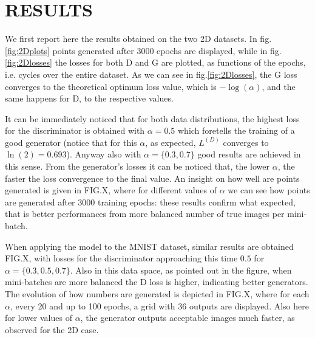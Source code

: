 \section{RESULTS} \label{results}

We first report here the results obtained on the two 2D datasets. In fig.\ref{fig:2Dplots} points generated after 3000 epochs are displayed, while in fig.\ref{fig:2Dlosses} the losses for both D and G are plotted, as functions of the epochs, i.e. cycles over the entire dataset.
As we can see in fig.\ref{fig:2Dlosses}, the G loss converges to the theoretical optimum loss value, which is $-\log(\alpha)$, and the same happens for D, to the respective values.

It can be immediately noticed that for both data distributions, the highest loss for the discriminator is obtained with $\alpha=0.5$ which foretells the training of a good generator (notice that for this $\alpha$, as expected, $L^{(D)}$ converges to $\ln(2)=0.693$). Anyway also with $\alpha=\{0.3,0.7\}$ good results are achieved in this sense. From the generator's losses it can be noticed that, the lower $\alpha$, the faster the loss convergence to the final value. An insight on how well are points generated is given in FIG.X, where for different values of $\alpha$ we can see how points are generated after 3000 training epochs: these results confirm what expected, that is better performances from more balanced number of true images per mini-batch.

When applying the model to the MNIST dataset, similar results are obtained FIG.X, with losses for the discriminator approaching this time $0.5$ for $\alpha=\{0.3,0.5,0.7\}$. Also in this data space, as pointed out in the figure, when mini-batches are more balanced the D loss is higher, indicating better generators.
The evolution of how numbers are generated is depicted in FIG.X, where for each $\alpha$, every 20 and up to 100 epochs, a grid with 36 outputs are displayed. Also here for lower values of $\alpha$, the generator outputs acceptable images much faster, as observed for the 2D case.

